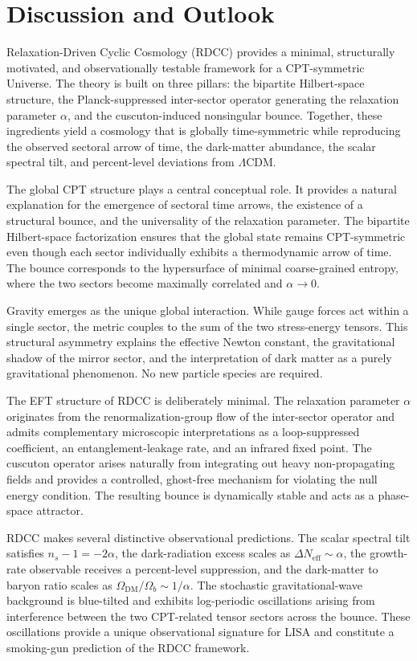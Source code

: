 \documentclass[11pt,a4paper]{article}
\begin{document}
\section{Discussion and Outlook}

Relaxation-Driven Cyclic Cosmology (RDCC) provides a minimal, structurally
motivated, and observationally testable framework for a CPT-symmetric Universe.
The theory is built on three pillars: the bipartite Hilbert-space structure, the
Planck-suppressed inter-sector operator generating the relaxation parameter
\(\alpha\), and the cuscuton-induced nonsingular bounce. Together, these
ingredients yield a cosmology that is globally time-symmetric while reproducing
the observed sectoral arrow of time, the dark-matter abundance, the scalar
spectral tilt, and percent-level deviations from \(\Lambda\)CDM.

The global CPT structure plays a central conceptual role. It provides a natural
explanation for the emergence of sectoral time arrows, the existence of a
structural bounce, and the universality of the relaxation parameter. The
bipartite Hilbert-space factorization ensures that the global state remains
CPT-symmetric even though each sector individually exhibits a thermodynamic
arrow of time. The bounce corresponds to the hypersurface of minimal
coarse-grained entropy, where the two sectors become maximally correlated and
\(\alpha \to 0\).

Gravity emerges as the unique global interaction. While gauge forces act within
a single sector, the metric couples to the sum of the two stress-energy tensors.
This structural asymmetry explains the effective Newton constant, the
gravitational shadow of the mirror sector, and the interpretation of dark matter
as a purely gravitational phenomenon. No new particle species are required.

The EFT structure of RDCC is deliberately minimal. The relaxation parameter
\(\alpha\) originates from the renormalization-group flow of the inter-sector
operator and admits complementary microscopic interpretations as a
loop-suppressed coefficient, an entanglement-leakage rate, and an infrared fixed
point. The cuscuton operator arises naturally from integrating out heavy
non-propagating fields and provides a controlled, ghost-free mechanism for
violating the null energy condition. The resulting bounce is dynamically stable
and acts as a phase-space attractor.

RDCC makes several distinctive observational predictions. The scalar spectral
tilt satisfies \(n_{s} - 1 = -2\alpha\), the dark-radiation excess scales as
\(\Delta N_{\mathrm{eff}} \sim \alpha\), the growth-rate observable receives a
percent-level suppression, and the dark-matter to baryon ratio scales as
\(\Omega_{\mathrm{DM}}/\Omega_{b} \sim 1/\alpha\). The stochastic
gravitational-wave background is blue-tilted and exhibits log-periodic
oscillations arising from interference between the two CPT-related tensor
sectors across the bounce. These oscillations provide a unique observational
signature for LISA and constitute a smoking-gun prediction of the RDCC
framework.
\end{document}

